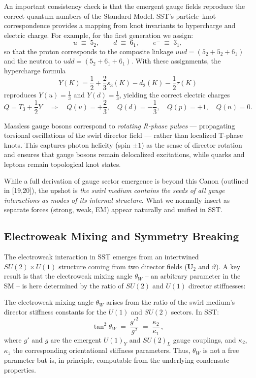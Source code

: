 \documentclass[reprint,aps,onecolumn,nofootinbib]{revtex4-2}
\begin{document}
        \noindent
        An important consistency check is that the emergent gauge fields reproduce the correct quantum numbers of the Standard Model.
        SST’s particle–knot correspondence provides a mapping from knot invariants to hypercharge and electric charge.
        For example, for the first generation we assign:
        \[
            u \;\equiv\; 5_2, \qquad d \;\equiv\; 6_1, \qquad e^- \;\equiv\; 3_1,
        \]
        so that the proton corresponds to the composite linkage $uud = (5_2 + 5_2 + 6_1)$ and the neutron to $udd = (5_2 + 6_1 + 6_1)$.
        With these assignments, the hypercharge formula
        \[
            Y(K) = \frac{1}{2} + \frac{2}{3}s_3(K) - d_2(K) - \frac{1}{2}\tau(K)
        \]
        reproduces $Y(u) = \tfrac{1}{3}$ and $Y(d) = \tfrac{1}{3}$, yielding the correct electric charges
        \[
            Q = T_3 + \frac{1}{2}Y \quad \Rightarrow \quad
            Q(u) = +\frac{2}{3}, \quad Q(d) = -\frac{1}{3}, \quad Q(p)=+1, \quad Q(n)=0.
        \]

        \noindent
        Massless gauge bosons correspond to \emph{rotating R-phase pulses} — propagating torsional oscillations of the swirl director field — rather than localized T-phase knots.
        This captures photon helicity (spin $\pm 1$) as the sense of director rotation and ensures that gauge bosons remain delocalized excitations, while quarks and leptons remain topological knot states.



	While a full derivation of gauge sector emergence is beyond this Canon (outlined in [19,20]), the upshot is \emph{the swirl medium contains the seeds of all gauge interactions as modes of its internal structure}. What we normally insert as separate forces (strong, weak, EM) appear naturally and unified in SST.

	\subsection*{Electroweak Mixing and Symmetry Breaking}
	The electroweak interaction in SST emerges from an intertwined $SU(2)\times U(1)$ structure coming from two director fields ($\mathbf{U}_2$ and $\vartheta$). A key result is that the electroweak mixing angle $\theta_W$ – an arbitrary parameter in the SM – is here determined by the ratio of $SU(2)$ and $U(1)$ director stiffnesses:

	\begin{tcolorbox}[title=Theorem 6.2: Weak Mixing Angle from First Principles]
		The electroweak mixing angle $\theta_W$ arises from the ratio of the swirl medium’s director stiffness constants for the $U(1)$ and $SU(2)$ sectors. In SST:
		\[
			\tan^2 \theta_W \;=\; \frac{g'^2}{g^2} \;=\; \frac{\kappa_2}{\kappa_1}\,,
		\]
		where $g'$ and $g$ are the emergent $U(1)_Y$ and $SU(2)_L$ gauge couplings, and $\kappa_2$, $\kappa_1$ the corresponding orientational stiffness parameters. Thus, $\theta_W$ is not a free parameter but is, in principle, computable from the underlying condensate properties.
	\end{tcolorbox}
\end{document}
